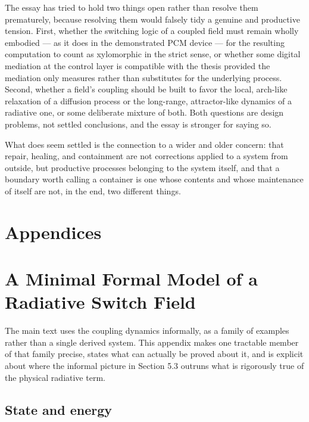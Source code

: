 \documentclass[11pt]{article}
\begin{document}
The essay has tried to hold two things open rather than resolve them prematurely, because resolving them would falsely tidy a genuine and productive tension. First, whether the switching logic of a coupled field must remain wholly embodied --- as it does in the demonstrated PCM device --- for the resulting computation to count as xylomorphic in the strict sense, or whether some digital mediation at the control layer is compatible with the thesis provided the mediation only measures rather than substitutes for the underlying process. Second, whether a field's coupling should be built to favor the local, arch-like relaxation of a diffusion process or the long-range, attractor-like dynamics of a radiative one, or some deliberate mixture of both. Both questions are design problems, not settled conclusions, and the essay is stronger for saying so.

What does seem settled is the connection to a wider and older concern: that repair, healing, and containment are not corrections applied to a system from outside, but productive processes belonging to the system itself, and that a boundary worth calling a container is one whose contents and whose maintenance of itself are not, in the end, two different things.

\section*{Appendices}

\appendix

\section{A Minimal Formal Model of a Radiative Switch Field}

The main text uses the coupling dynamics informally, as a family of examples rather than a single derived system. This appendix makes one tractable member of that family precise, states what can actually be proved about it, and is explicit about where the informal picture in Section 5.3 outruns what is rigorously true of the physical radiative term.

\subsection{State and energy}
\end{document}
